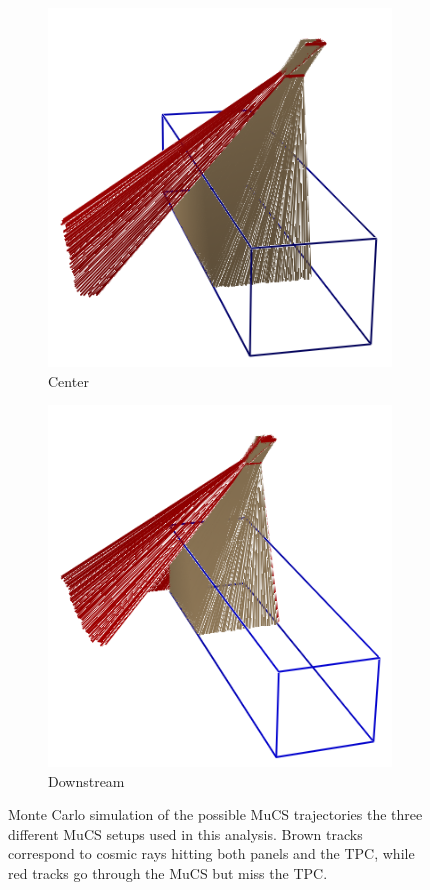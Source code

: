 \documentclass[a4paper]{scrartcl}
\begin{document}
\begin{figure}[htbp]
\begin{subfigure}{0.30\textwidth}
    \includegraphics[width=\linewidth]{figures/center.png}
    \caption{Center} \label{fig:centre}
  \end{subfigure}
  \begin{subfigure}{0.30\textwidth}
    \includegraphics[width=\linewidth]{figures/downstream.png}
    \caption{Downstream} \label{fig:downstream}
  \end{subfigure}

  \caption{Monte Carlo simulation of the possible MuCS trajectories the three different MuCS setups used in this analysis. Brown tracks correspond to cosmic rays hitting both panels and the TPC, while red tracks go through the MuCS but miss the TPC.} \label{fig:mucs}
\end{figure}
\end{document}
